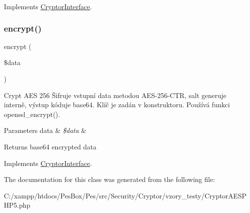 Implements \mbox{\hyperlink{interface_pes_1_1_security_1_1_cryptor_1_1_cryptor_interface}{Cryptor\+Interface}}.

\mbox{\label{class_pes_1_1_security_1_1_cryptor_1_1_cryptor_a_e_s_p_h_p5_a07bcc8ef1d23370470ecb5ae8fc07dfa}} 
\subsubsection{\texorpdfstring{encrypt()}{encrypt()}}
{\footnotesize\ttfamily encrypt (\begin{DoxyParamCaption}\item[{}]{\$data }\end{DoxyParamCaption})}

Crypt A\+ES 256 Šifruje vstupní data metodou A\+E\+S-\/256-\/\+C\+TR, salt generuje interně, výstup kóduje base64. Klíč je zadán v konstruktoru. Používá funkci openssl\+\_\+encrypt().


\begin{DoxyParams}[1]{Parameters}
data & {\em \$data} & \\
\hline
\end{DoxyParams}
\begin{DoxyReturn}{Returns}
base64 encrypted data 
\end{DoxyReturn}


Implements \mbox{\hyperlink{interface_pes_1_1_security_1_1_cryptor_1_1_cryptor_interface}{Cryptor\+Interface}}.



The documentation for this class was generated from the following file\+:\begin{DoxyCompactItemize}
\item 
C\+:/xampp/htdocs/\+Pes\+Box/\+Pes/src/\+Security/\+Cryptor/vzory\+\_\+testy/Cryptor\+A\+E\+S\+P\+H\+P5.\+php\end{DoxyCompactItemize}
